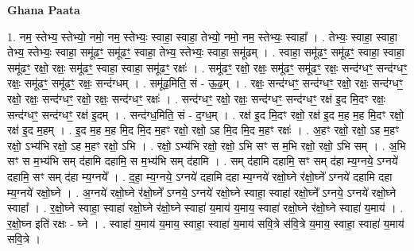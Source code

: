 \documentclass[17pt]{extarticle}
\begin{document}
\textbf{Ghana Paata } \newline

1. नम॒ स्तेभ्य॒ स्तेभ्यो॒ नमो॒ नम॒ स्तेभ्यः॒ स्वाहा॒ स्वाहा॒ तेभ्यो॒ नमो॒ नम॒ स्तेभ्यः॒ स्वाहा᳚ । . तेभ्यः॒ स्वाहा॒ स्वाहा॒ तेभ्य॒ स्तेभ्यः॒ स्वाहा॒ समू॑ढꣳ॒॒ समू॑ढꣳ॒॒ स्वाहा॒ तेभ्य॒ स्तेभ्यः॒ स्वाहा॒ समू॑ढम् । . स्वाहा॒ समू॑ढꣳ॒॒ समू॑ढꣳ॒॒ स्वाहा॒ स्वाहा॒ समू॑ढꣳ॒॒ रक्षो॒ रक्षः॒ समू॑ढꣳ॒॒ स्वाहा॒ स्वाहा॒ समू॑ढꣳ॒॒ रक्षः॑ । . समू॑ढꣳ॒॒ रक्षो॒ रक्षः॒ समू॑ढꣳ॒॒ समू॑ढꣳ॒॒ रक्षः॒ सन्द॑ग्धꣳ॒॒ सन्द॑ग्धꣳ॒॒ रक्षः॒ समू॑ढꣳ॒॒ समू॑ढꣳ॒॒ रक्षः॒ सन्द॑ग्धम् । . समू॑ढ॒मिति॒ सं - ऊ॒ढ॒म् । . रक्षः॒ सन्द॑ग्धꣳ॒॒ सन्द॑ग्धꣳ॒॒ रक्षो॒ रक्षः॒ सन्द॑ग्धꣳ॒॒ रक्षो॒ रक्षः॒ सन्द॑ग्धꣳ॒॒ रक्षो॒ रक्षः॒ सन्द॑ग्धꣳ॒॒ रक्षः॑ । . सन्द॑ग्धꣳ॒॒ रक्षो॒ रक्षः॒ सन्द॑ग्धꣳ॒॒ सन्द॑ग्धꣳ॒॒ रक्ष॑ इ॒द मि॒दꣳ रक्षः॒ सन्द॑ग्धꣳ॒॒ सन्द॑ग्धꣳ॒॒ रक्ष॑ इ॒दम् । . सन्द॑ग्ध॒मिति॒ सं - द॒ग्ध॒म् । . रक्ष॑ इ॒द मि॒दꣳ रक्षो॒ रक्ष॑ इ॒द म॒ह म॒ह मि॒दꣳ रक्षो॒ रक्ष॑ इ॒द म॒हम् । . इ॒द म॒ह म॒ह मि॒द मि॒द म॒हꣳ रक्षो॒ रक्षो॒ ऽह मि॒द मि॒द म॒हꣳ रक्षः॑ । . अ॒हꣳ रक्षो॒ रक्षो॒ ऽह म॒हꣳ रक्षो॒ ऽभ्य॑भि रक्षो॒ ऽह म॒हꣳ रक्षो॒ ऽभि । . रक्षो॒ ऽभ्य॑भि रक्षो॒ रक्षो॒ ऽभि सꣳ स म॒भि रक्षो॒ रक्षो॒ ऽभि सम् । . अ॒भि सꣳ स म॒भ्य॑भि सम् द॑हामि दहामि॒ स म॒भ्य॑भि सम् द॑हामि । . सम् द॑हामि दहामि॒ सꣳ सम् द॑हा म्य॒ग्नये॒ ऽग्नये॑ दहामि॒ सꣳ सम् द॑हा म्य॒ग्नये᳚ । . द॒हा॒ म्य॒ग्नये॒ ऽग्नये॑ दहामि दहा म्य॒ग्नये॑ रक्षो॒घ्ने र॑क्षो॒घ्ने᳚ ऽग्नये॑ दहामि दहा म्य॒ग्नये॑ रक्षो॒घ्ने । . अ॒ग्नये॑ रक्षो॒घ्ने र॑क्षो॒घ्ने᳚ ऽग्नये॒ ऽग्नये॑ रक्षो॒घ्ने स्वाहा॒ स्वाहा॑ रक्षो॒घ्ने᳚ ऽग्नये॒ ऽग्नये॑ रक्षो॒घ्ने स्वाहा᳚ । . र॒क्षो॒घ्ने स्वाहा॒ स्वाहा॑ रक्षो॒घ्ने र॑क्षो॒घ्ने स्वाहा॑ य॒माय॑ य॒माय॒ स्वाहा॑ रक्षो॒घ्ने र॑क्षो॒घ्ने स्वाहा॑ य॒माय॑ । . र॒क्षो॒घ्न इति॑ रक्षः - घ्ने । . स्वाहा॑ य॒माय॑ य॒माय॒ स्वाहा॒ स्वाहा॑ य॒माय॑ सवि॒त्रे स॑वि॒त्रे य॒माय॒ स्वाहा॒ स्वाहा॑ य॒माय॑ सवि॒त्रे । \newline
\end{document}
